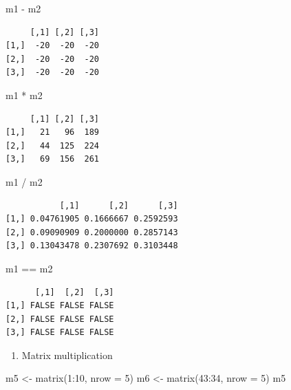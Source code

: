 \documentclass[
  letterpaper,
  DIV=11,
  numbers=noendperiod]{scrreprt}
\newenvironment{Shaded}{\begin{snugshade}}{\end{snugshade}}
\newcommand{\AttributeTok}[1]{\textcolor[rgb]{0.40,0.45,0.13}{#1}}
\newcommand{\DecValTok}[1]{\textcolor[rgb]{0.68,0.00,0.00}{#1}}
\newcommand{\FunctionTok}[1]{\textcolor[rgb]{0.28,0.35,0.67}{#1}}
\newcommand{\NormalTok}[1]{\textcolor[rgb]{0.00,0.23,0.31}{#1}}
\newcommand{\OtherTok}[1]{\textcolor[rgb]{0.00,0.23,0.31}{#1}}
\newcommand{\SpecialCharTok}[1]{\textcolor[rgb]{0.37,0.37,0.37}{#1}}
\providecommand{\tightlist}{%
  \setlength{\itemsep}{0pt}\setlength{\parskip}{0pt}}\usepackage{longtable,booktabs,array}
\begin{document}
\begin{Shaded}
\begin{Highlighting}[]
\NormalTok{m1 }\SpecialCharTok{{-}}\NormalTok{ m2}
\end{Highlighting}
\end{Shaded}

\begin{verbatim}
     [,1] [,2] [,3]
[1,]  -20  -20  -20
[2,]  -20  -20  -20
[3,]  -20  -20  -20
\end{verbatim}

\begin{Shaded}
\begin{Highlighting}[]
\NormalTok{m1 }\SpecialCharTok{*}\NormalTok{ m2}
\end{Highlighting}
\end{Shaded}

\begin{verbatim}
     [,1] [,2] [,3]
[1,]   21   96  189
[2,]   44  125  224
[3,]   69  156  261
\end{verbatim}

\begin{Shaded}
\begin{Highlighting}[]
\NormalTok{m1 }\SpecialCharTok{/}\NormalTok{ m2}
\end{Highlighting}
\end{Shaded}

\begin{verbatim}
           [,1]      [,2]      [,3]
[1,] 0.04761905 0.1666667 0.2592593
[2,] 0.09090909 0.2000000 0.2857143
[3,] 0.13043478 0.2307692 0.3103448
\end{verbatim}

\begin{Shaded}
\begin{Highlighting}[]
\NormalTok{m1 }\SpecialCharTok{==}\NormalTok{ m2}
\end{Highlighting}
\end{Shaded}

\begin{verbatim}
      [,1]  [,2]  [,3]
[1,] FALSE FALSE FALSE
[2,] FALSE FALSE FALSE
[3,] FALSE FALSE FALSE
\end{verbatim}

\begin{enumerate}
\def\labelenumi{\alph{enumi}.}
\setcounter{enumi}{3}
\tightlist
\item
  Matrix multiplication
\end{enumerate}

\begin{Shaded}
\begin{Highlighting}[]
\NormalTok{m5 }\OtherTok{\textless{}{-}} \FunctionTok{matrix}\NormalTok{(}\DecValTok{1}\SpecialCharTok{:}\DecValTok{10}\NormalTok{, }\AttributeTok{nrow =} \DecValTok{5}\NormalTok{)}
\NormalTok{m6 }\OtherTok{\textless{}{-}} \FunctionTok{matrix}\NormalTok{(}\DecValTok{43}\SpecialCharTok{:}\DecValTok{34}\NormalTok{, }\AttributeTok{nrow =} \DecValTok{5}\NormalTok{)}
\NormalTok{m5}
\end{Highlighting}
\end{Shaded}
\end{document}
